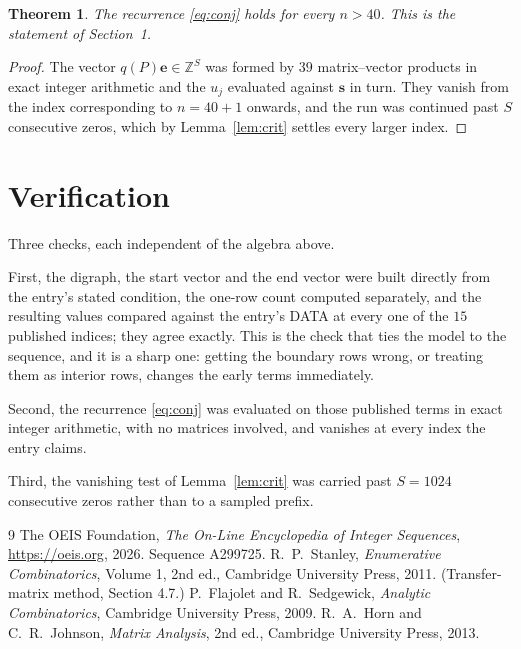\documentclass[11pt,a4paper]{article}
\theoremstyle{plain}
\newtheorem{theorem}{Theorem}
\theoremstyle{definition}
\begin{document}
\begin{theorem}
The recurrence \eqref{eq:conj} holds for every $n>40$. This is the statement of
Section~1.
\end{theorem}

\begin{proof}
The vector $q(P)\mathbf{e}\in\mathbb{Z}^{S}$ was formed by $39$ matrix--vector
products in exact integer arithmetic and the $u_j$ evaluated against $\mathbf{s}$ in turn.
They vanish from the index corresponding to $n=40+1$ onwards, and the run was continued
past $S$ consecutive zeros, which by Lemma~\ref{lem:crit} settles every larger index.
\end{proof}

\section{Verification}

Three checks, each independent of the algebra above.

First, the digraph, the start vector and the end vector were built directly from the
entry's stated condition, the one-row count computed separately, and the resulting values
compared against the entry's DATA at every one of the $15$ published indices; they
agree exactly. This is the check that ties the model to the sequence, and it is a sharp one:
getting the boundary rows wrong, or treating them as interior rows, changes the early terms
immediately.

Second, the recurrence \eqref{eq:conj} was evaluated on those published terms in exact
integer arithmetic, with no matrices involved, and vanishes at every index the entry claims.

Third, the vanishing test of Lemma~\ref{lem:crit} was carried past $S=1024$ consecutive
zeros rather than to a sampled prefix.

\begin{thebibliography}{9}
 The OEIS Foundation, \emph{The On-Line Encyclopedia of Integer
Sequences}, \url{https://oeis.org}, 2026. Sequence A299725.
 R.~P.~Stanley, \emph{Enumerative Combinatorics}, Volume 1, 2nd ed.,
Cambridge University Press, 2011. (Transfer-matrix method, Section 4.7.)
 P.~Flajolet and R.~Sedgewick, \emph{Analytic Combinatorics}, Cambridge
University Press, 2009.
 R.~A.~Horn and C.~R.~Johnson, \emph{Matrix Analysis}, 2nd ed., Cambridge
University Press, 2013.
\end{thebibliography}
\end{document}

